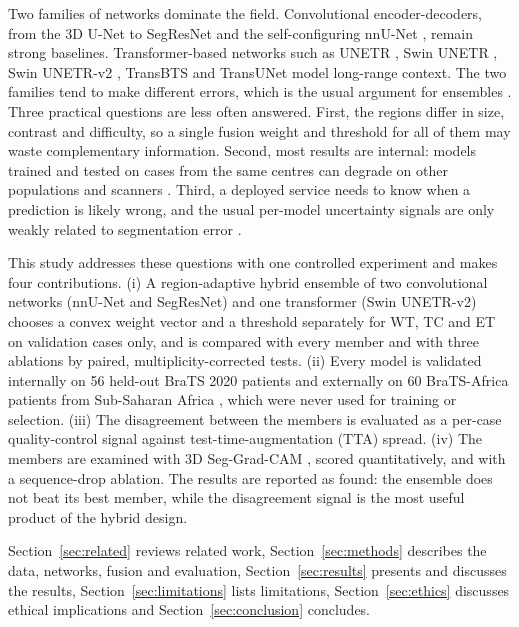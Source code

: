 \documentclass[a4paper,fleqn]{cas-sc}
\begin{document}
Two families of networks dominate the field. Convolutional encoder-decoders, from the 3D U-Net \citep{ronneberger2015,cicek2016} to SegResNet \citep{myronenko2019} and the self-configuring nnU-Net \citep{isensee2021}, remain strong baselines. Transformer-based networks such as UNETR \citep{hatamizadeh2022unetr}, Swin UNETR \citep{hatamizadeh2022swin}, Swin UNETR-v2 \citep{he2023}, TransBTS \citep{wang2021} and TransUNet \citep{chen2024} model long-range context. The two families tend to make different errors, which is the usual argument for ensembles \citep{kamnitsas2018}. Three practical questions are less often answered. First, the regions differ in size, contrast and difficulty, so a single fusion weight and threshold for all of them may waste complementary information. Second, most results are internal: models trained and tested on cases from the same centres can degrade on other populations and scanners \citep{zech2018}. Third, a deployed service needs to know when a prediction is likely wrong, and the usual per-model uncertainty signals are only weakly related to segmentation error \citep{jungo2019,mehrtash2020}.

This study addresses these questions with one controlled experiment and makes four contributions. (i) A region-adaptive hybrid ensemble of two convolutional networks (nnU-Net and SegResNet) and one transformer (Swin UNETR-v2) chooses a convex weight vector and a threshold separately for WT, TC and ET on validation cases only, and is compared with every member and with three ablations by paired, multiplicity-corrected tests. (ii) Every model is validated internally on 56 held-out BraTS 2020 patients and externally on 60 BraTS-Africa patients from Sub-Saharan Africa \citep{adewole2025}, which were never used for training or selection. (iii) The disagreement between the members is evaluated as a per-case quality-control signal against test-time-augmentation (TTA) spread. (iv) The members are examined with 3D Seg-Grad-CAM \citep{selvaraju2017,vinogradova2020}, scored quantitatively, and with a sequence-drop ablation. The results are reported as found: the ensemble does not beat its best member, while the disagreement signal is the most useful product of the hybrid design.

Section~\ref{sec:related} reviews related work, Section~\ref{sec:methods} describes the data, networks, fusion and evaluation, Section~\ref{sec:results} presents and discusses the results, Section~\ref{sec:limitations} lists limitations, Section~\ref{sec:ethics} discusses ethical implications and Section~\ref{sec:conclusion} concludes.
\end{document}
